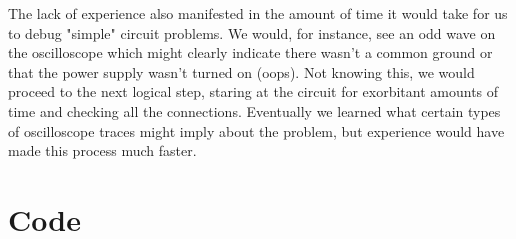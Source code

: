 \documentclass{article}	%
\begin{document}
\begin{multicols}{2}
The lack of experience also manifested in
the amount of time it would take for 
us to debug "simple" circuit problems.
We would, for instance, see an odd
wave on the oscilloscope which might clearly
indicate there wasn't a common ground or 
that the power supply wasn't turned on (oops).
Not knowing this,
we would proceed to the next logical step,
staring at the circuit for exorbitant amounts of time
and checking all the connections.
Eventually we learned what certain types of
oscilloscope traces might imply about the problem, but
experience would have made this process much faster.

\end{multicols}

\newpage
\section{Code}




%
%






\end{document}
